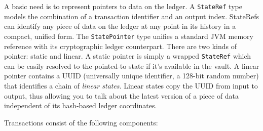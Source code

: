 \documentclass{article}
\begin{document}
A basic need is to represent pointers to data on the ledger. A \texttt{StateRef} type models the combination of a
transaction identifier and an output index. StateRefs can identify any piece of data on the ledger at any point in
its history in a compact, unified form. The \texttt{StatePointer} type unifies a standard JVM memory reference with
its cryptographic ledger counterpart. There are two kinds of pointer: static and linear. A static pointer is simply
a wrapped \texttt{StateRef} which can be easily resolved to the pointed-to state if it's available in the vault. A
linear pointer contains a UUID (universally unique identifier, a 128-bit random number) that identifies a chain of
\emph{linear states}. Linear states copy the UUID from input to output, thus allowing you to talk about the latest
version of a piece of data independent of its hash-based ledger coordinates.

Transactions consist of the following components:
\end{document}
